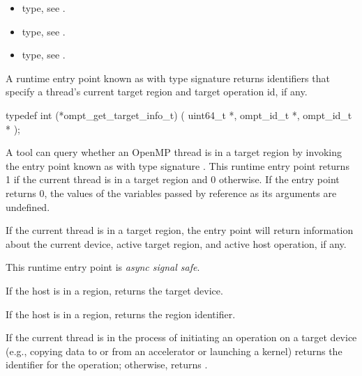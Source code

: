 \crossreferences
\begin{itemize}
\item {} type, see .
\item {} type, see .
\item {} type, see
  .
\end{itemize}

\label{sec:ompt_get_target_info_t}
\label{sec:ompt_get_target_info}

\summary
A runtime entry point known as 
with type signature  returns identifiers that specify a
thread's current target region and target operation id, if any.

\format
\begin{ccppspecific}
\begin{omptInquiry}
typedef int (*ompt_get_target_info_t) (
  uint64_t *,
  ompt_id_t *,
  ompt_id_t *
);
\end{omptInquiry}
\end{ccppspecific}

\descr
A tool can query whether an OpenMP thread is in a target region by
invoking the entry point known as 
with type signature .
This runtime entry point returns 1 if the current thread is
in a target region and 0 otherwise. If the entry point returns 0,
the values of the variables passed by reference as its arguments
are undefined.

If the current thread is in a target region, the entry point will
return information about the current device, active target region, and
active host operation, if any.

This runtime entry point is \emph{async signal safe}.

\argdesc

If the host is in a  region,
 returns the target device.

If the host is in a  region,
 returns the  region identifier.

If the current thread is in the process of initiating an
operation on a target device (e.g., copying data to or from an
accelerator or launching a kernel)  returns
the identifier for the operation; otherwise,
 returns .

